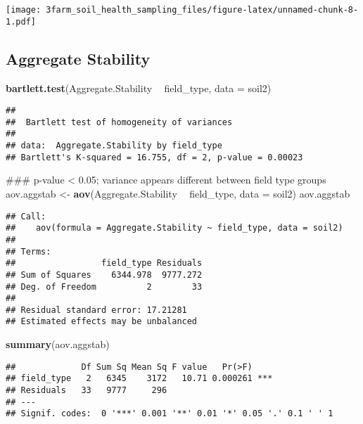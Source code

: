 \documentclass[]{article}
\newenvironment{Shaded}{\begin{snugshade}}{\end{snugshade}}
\newcommand{\KeywordTok}[1]{\textcolor[rgb]{0.13,0.29,0.53}{\textbf{#1}}}
\newcommand{\DataTypeTok}[1]{\textcolor[rgb]{0.13,0.29,0.53}{#1}}
\newcommand{\StringTok}[1]{\textcolor[rgb]{0.31,0.60,0.02}{#1}}
\newcommand{\OperatorTok}[1]{\textcolor[rgb]{0.81,0.36,0.00}{\textbf{#1}}}
\newcommand{\NormalTok}[1]{#1}
\begin{document}
\texttt{[image: 3farm\_soil\_health\_sampling\_files/figure-latex/unnamed-chunk-8-1.pdf]}

\subsection{Aggregate Stability}\label{aggregate-stability}

\begin{Shaded}
\begin{Highlighting}[]
\KeywordTok{bartlett.test}\NormalTok{(Aggregate.Stability }\OperatorTok{~}\StringTok{ }\NormalTok{field_type, }\DataTypeTok{data =}\NormalTok{ soil2)}
\end{Highlighting}
\end{Shaded}

\begin{verbatim}
## 
##  Bartlett test of homogeneity of variances
## 
## data:  Aggregate.Stability by field_type
## Bartlett's K-squared = 16.755, df = 2, p-value = 0.00023
\end{verbatim}

\begin{Shaded}
\begin{Highlighting}[]
\NormalTok{### p-value < 0.05; variance appears different between field type groups}
\NormalTok{aov.aggstab <-}\StringTok{ }\KeywordTok{aov}\NormalTok{(Aggregate.Stability }\OperatorTok{~}\StringTok{ }\NormalTok{field_type, }\DataTypeTok{data =}\NormalTok{ soil2)}
\NormalTok{aov.aggstab}
\end{Highlighting}
\end{Shaded}

\begin{verbatim}
## Call:
##    aov(formula = Aggregate.Stability ~ field_type, data = soil2)
## 
## Terms:
##                 field_type Residuals
## Sum of Squares    6344.978  9777.272
## Deg. of Freedom          2        33
## 
## Residual standard error: 17.21281
## Estimated effects may be unbalanced
\end{verbatim}

\begin{Shaded}
\begin{Highlighting}[]
\KeywordTok{summary}\NormalTok{(aov.aggstab)}
\end{Highlighting}
\end{Shaded}

\begin{verbatim}
##             Df Sum Sq Mean Sq F value   Pr(>F)    
## field_type   2   6345    3172   10.71 0.000261 ***
## Residuals   33   9777     296                     
## ---
## Signif. codes:  0 '***' 0.001 '**' 0.01 '*' 0.05 '.' 0.1 ' ' 1
\end{verbatim}
\end{document}
